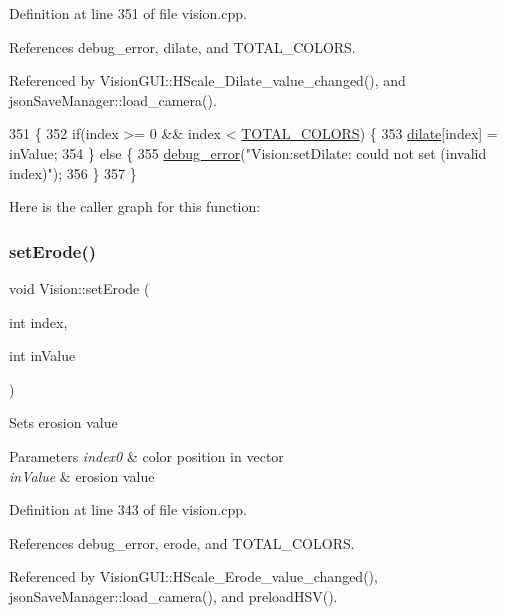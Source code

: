 Definition at line 351 of file vision.\+cpp.



References debug\+\_\+error, dilate, and T\+O\+T\+A\+L\+\_\+\+C\+O\+L\+O\+RS.



Referenced by Vision\+G\+U\+I\+::\+H\+Scale\+\_\+\+Dilate\+\_\+value\+\_\+changed(), and json\+Save\+Manager\+::load\+\_\+camera().


\begin{DoxyCode}
351                                              \{
352     \textcolor{keywordflow}{if}(index >= 0 && index < \hyperlink{class_vision_a9fbea649a805b17ad9ea18f3f06c14f2}{TOTAL\_COLORS}) \{
353         \hyperlink{class_vision_a406af58255882218a4d49f41b7e3a67a}{dilate}[index] = inValue;
354     \} \textcolor{keywordflow}{else} \{
355         \hyperlink{debug_8hpp_ab163a9e3f1ed9f61bd7d743fdf4a161a}{debug\_error}(\textcolor{stringliteral}{"Vision:setDilate: could not set (invalid index)"});
356     \}
357 \}
\end{DoxyCode}
Here is the caller graph for this function\+:
\mbox{\label{class_vision_a1313404c61d1518f8b8cb354377ed5f1}} 
\subsubsection{\texorpdfstring{set\+Erode()}{setErode()}}
{\footnotesize\ttfamily void Vision\+::set\+Erode (\begin{DoxyParamCaption}\item[{int}]{index,  }\item[{int}]{in\+Value }\end{DoxyParamCaption})}

Sets erosion value 
\begin{DoxyParams}{Parameters}
{\em index0} & color position in vector \\
\hline
{\em in\+Value} & erosion value \\
\hline
\end{DoxyParams}


Definition at line 343 of file vision.\+cpp.



References debug\+\_\+error, erode, and T\+O\+T\+A\+L\+\_\+\+C\+O\+L\+O\+RS.



Referenced by Vision\+G\+U\+I\+::\+H\+Scale\+\_\+\+Erode\+\_\+value\+\_\+changed(), json\+Save\+Manager\+::load\+\_\+camera(), and preload\+H\+S\+V().



